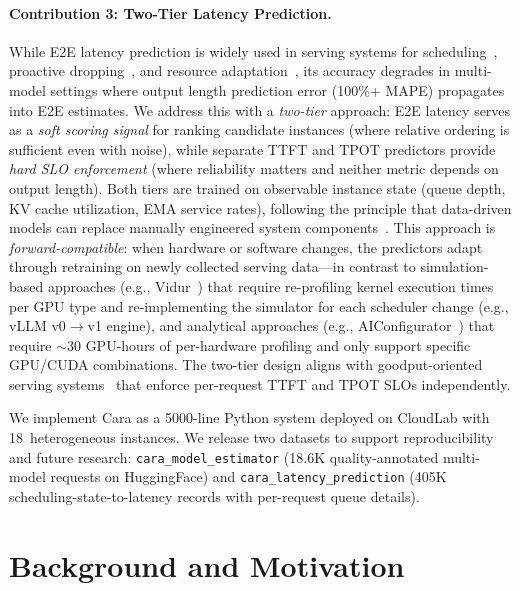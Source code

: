 \documentclass[letterpaper, anonymous, twocolumn, 10pt]{article}
\begin{document}
\paragraph{Contribution 3: Two-Tier Latency Prediction.}
While E2E latency prediction is widely used in serving systems for scheduling~\cite{da2025blockbalancingloadllm, SamuLLM}, proactive dropping~\cite{pard2025}, and resource adaptation~\cite{timebill2025}, its accuracy degrades in multi-model settings where output length prediction error (100\%+ MAPE) propagates into E2E estimates.
We address this with a \emph{two-tier} approach: E2E latency serves as a \emph{soft scoring signal} for ranking candidate instances (where relative ordering is sufficient even with noise), while separate TTFT and TPOT predictors provide \emph{hard SLO enforcement} (where reliability matters and neither metric depends on output length).
Both tiers are trained on observable instance state (queue depth, KV cache utilization, EMA service rates), following the principle that data-driven models can replace manually engineered system components~\cite{kraska2018case}.
This approach is \emph{forward-compatible}: when hardware or software changes, the predictors adapt through retraining on newly collected serving data---in contrast to simulation-based approaches (e.g., Vidur~\cite{Agrawal2024VidurAL}) that require re-profiling kernel execution times per GPU type and re-implementing the simulator for each scheduler change (e.g., vLLM v0$\rightarrow$v1 engine), and analytical approaches (e.g., AIConfigurator~\cite{aiconfigurator2025}) that require $\sim$30 GPU-hours of per-hardware profiling and only support specific GPU/CUDA combinations.
The two-tier design aligns with goodput-oriented serving systems~\cite{qlm, chen2025slosserveoptimizedservingmultislo} that enforce per-request TTFT and TPOT SLOs independently.

We implement Cara as a 5000-line Python system deployed on CloudLab with 18~heterogeneous instances.
We release two datasets to support reproducibility and future research: \texttt{cara\_model\_estimator} (18.6K quality-annotated multi-model requests on HuggingFace) and \texttt{cara\_latency\_prediction} (405K scheduling-state-to-latency records with per-request queue details).


\section{Background and Motivation} \label{section:motivation}
\end{document}
